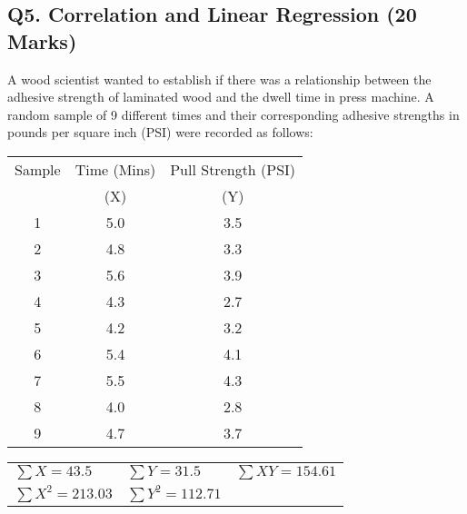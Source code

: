 %

\newpage
\subsection*{Q5. Correlation and Linear Regression (20 Marks)} %

A wood scientist wanted to establish if there was a relationship between the adhesive strength of laminated wood and the dwell time in press machine. A random sample of 9 different times and their corresponding adhesive strengths in pounds per square inch (PSI) were recorded as follows:

\begin{center}
\begin{tabular}{|c|c|c|}

  \hline
Sample &Time (Mins) & Pull Strength (PSI) \\
 & (X)  &  (Y)\\ \hline
1& 5.0& 3.5 \\
2& 4.8& 3.3\\
3& 5.6& 3.9\\
4& 4.3& 2.7\\
5& 4.2& 3.2\\
6& 5.4& 4.1\\
7& 5.5& 4.3\\
8& 4.0& 2.8\\
9& 4.7& 3.7\\
  \hline
\end{tabular}
\bigskip

\begin{tabular}{lll}
  $\sum X = 43.5$ & $\sum Y = 31.5$ & $\sum XY = 154.61$ \\
  $\sum X^2 = 213.03$ & $\sum Y^2 = 112.71$ &  \\
 \end{tabular}
 \end{center}

